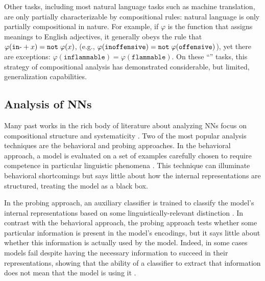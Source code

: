 Other tasks, including most natural language tasks such as machine translation, are only partially characterizable by compositional rules: natural language is only partially compositional in nature. For example, if $\varphi$ is the function that assigns meanings to English adjectives, it generally obeys the rule that $\varphi(\mathtt{in\mbox{-}} + x) = \mathtt{not} \hspace{1mm} \varphi(x)$, (e.g., $\varphi(\mathtt{inoffensive}) = \mathtt{not} \hspace{1mm} \varphi(\mathtt{offensive})$), yet there are exceptions: $\varphi(\mathtt{inflammable}) = \varphi(\mathtt{flammable})$. On these ``'' tasks, this strategy of compositional analysis has demonstrated considerable, but limited, generalization capabilities.

\subsection{Analysis of NNs}

Many past works in the rich body of literature about analyzing NNs focus on compositional structure
\citep{hupkes2020compositionality, hupkes2018visualisation, hewitt2019structural, li-etal-2019-compositional} and systematicity \citep{lake2018generalization,goodwin2020probing}. %
Two of the most popular analysis techniques are the behavioral and probing approaches. In the behavioral approach, a model is evaluated  on a set of examples carefully chosen to require competence in particular linguistic phenomena \citep{marvin2018targeted, wang2018glue, dasgupta2019analyzing, poliak2018collecting,linzen2016assessing,mccoy2019right,warstadt2019blimp}. This technique can illuminate behavioral shortcomings but says little about how the internal representations are structured, treating the model as a black box.

In the probing approach, an auxiliary classifier is trained to classify the model's internal representations based on some linguistically-relevant distinction \citep{adi2016fine,giulianelli2018hood,conneau2018cram,conneau2018senteval,belinkov2017evaluating,blevins2018hierarchical,peters2018dissecting,tenney2018what}. In contrast with the behavioral approach, the probing approach tests whether some particular information is present in the model's encodings, but it says little about whether this information is actually used by the model. Indeed, in some cases models fail despite having the necessary information to succeed in their representations, showing that the ability of a classifier to extract that information does not mean that the model is using it \citep{ Voita2020InformationTheoreticPW, ravichander2020probing,vanmassenhove2017investigating}.

